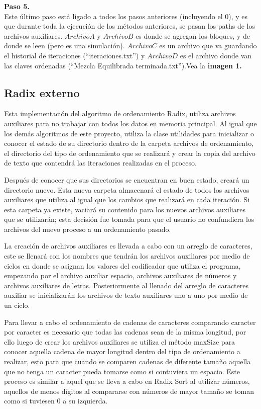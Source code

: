 \documentclass[12pt, letterpaper]{report}
\begin{document}
    \newpage
    
    \textbf{Paso 5.}\\
    Este último paso está ligado a todos los pasos anteriores (incluyendo el 0), y es que durante toda la ejecución de los métodos anteriores, se pasan los paths de los archivos auxiliares. $ArchivoA$ y $ArchivoB$ es donde se agregan los bloques, y de donde se leen (pero es una simulación). $Archivo C$ es un archivo que va guardando el historial de iteraciones (``iteraciones.txt'') y $Archivo D$ es el archivo donde van las claves ordenadas (``Mezcla Equilibrada terminada.txt'').Vea la \textbf{imagen 1.}
    
   
    \subsection*{Radix externo}
    Esta implementación del algoritmo de ordenamiento Radix, utiliza archivos auxiliares para no trabajar con todos los datos en memoria principal. Al igual que los demás algoritmos de este proyecto, utiliza la clase utilidades para inicializar o conocer el estado de su directorio dentro de la carpeta archivos de ordenamiento, el directorio del tipo de ordenamiento que se realizará y crear la copia del archivo de texto que contendrá las iteraciones realizadas en el proceso.
    
    Después de conocer que sus directorios se encuentran en buen estado, creará un directorio nuevo. Esta nueva carpeta almacenará el estado de todos los archivos auxiliares que utiliza al igual que los cambios que realizará en cada iteración. Si esta carpeta ya existe, vaciará su contenido para los nuevos archivos auxiliares que se utilizarán; esta decisión fue tomada para que el usuario no confundiera los archivos del nuevo proceso a un ordenamiento pasado.
    
    La creación de archivos auxiliares es llevada a cabo con un arreglo de caracteres, este se llenará con los nombres que tendrán los archivos auxiliares por medio de ciclos en donde se asignan los valores del codificador que utiliza el programa, empezando por el archivo auxiliar espacio, archivos auxiliares de números y archivos auxiliares de letras. Posteriormente al llenado del arreglo de caracteres auxiliar se inicializarán los archivos de texto auxiliares uno a uno por medio de un ciclo.
    
    Para llevar a cabo el ordenamiento de cadenas de caracteres comparando caracter por caracter es necesario que todas las cadenas sean de la misma longitud, por ello luego de crear los archivos auxiliares se utiliza el método maxSize para conocer aquella cadena de mayor longitud dentro del tipo de ordenamiento a realizar, esto para que cuando se comparen cadenas de diferente tamaño aquella que no tenga un caracter pueda tomarse como si contuviera un espacio. Este proceso es similar a aquel que se lleva a cabo en Radix Sort al utilizar números, aquellos de menos dígitos al compararse con números de mayor tamaño se toman como si tuviesen 0 a su izquierda.
    
\end{document}
